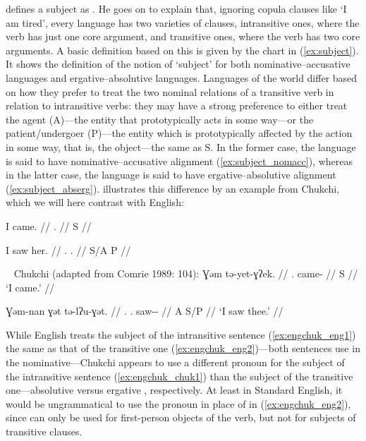 \citet{dixon2010} defines a subject as . He goes on to explain that,
ignoring copula clauses like `I am tired', every language has two varieties of
clauses, intransitive ones, where the verb has just one core argument, and
transitive ones, where the verb has two core arguments. A basic definition
based on this is given by the chart in (\ref{ex:subject}). It shows the
definition of the notion of `subject' for both nominative--accusative languages
and ergative--absolutive languages. Languages of the world differ based on how
they prefer to treat the two nominal relations of a transitive verb in relation
to intransitive verbs: they may have a strong preference to either treat the
agent (A)---the entity that prototypically acts in some way---or the
patient/undergoer (P)---the entity which is prototypically affected by the
action in some way, that is, the object---the same as S. In the former case,
the language is said to have nominative--accusative alignment
(\ref{ex:subject_nomacc}), whereas in the latter case, the language is said to
have ergative--absolutive alignment (\ref{ex:subject_abserg}).
\citet{comrie1989} illustrates this difference by an example from Chukchi,
which we will here contrast with English:

%
\pex\label{ex:engchuk_eng}
\a\label{ex:engchuk_eng1}\begingl
	\gla I came. //
	\glb \Fsg{}.\Nom{} {} //
	\glc S {} //
\endgl

\a\label{ex:engchuk_eng2}\begingl
	\gla I saw her. //
	\glb \Fsg{}.\Nom{} {} \TsgF{}.\Obl{} //
	\glc S/A {} P //
\endgl

\xe

%
\pex~\label{ex:engchuk_chuk}%
Chukchi (adapted from Comrie 1989: 104\nocite{comrie1989}):
\a\label{ex:engchuk_chuk1}\begingl
	\gla Ɣəm tə-yet-ɣʔek. //
	\glb \Fsg{}.\Abs{} came-\Fsg{} //
	\glc S {} //
	\glft `I came.' //
\endgl

\a\label{ex:engchuk_chuk2}\begingl
	\gla Ɣəm-nan ɣət tə-lʔu-ɣət. //
	\glb \Fsg{}.\Erg{} \Ssg{}.\Abs{} saw-\Fsg{}-\Ssg{} //
	\glc A S/P {} //
	\glft `I saw thee.' //
\endgl

\xe

While English treats the subject of the intransitive sentence
(\ref{ex:engchuk_eng1}) the same as that of the transitive one
(\ref{ex:engchuk_eng2})---both sentences use  in the nominative---Chukchi
appears to use a different pronoun for the subject of the intransitive sentence
(\ref{ex:engchuk_chuk1}) than the subject of the transitive one---absolutive
 versus ergative , respectively. At least in Standard
English, it would be ungrammatical to use the pronoun  in place of
 in (\ref{ex:engchuk_eng2}), since  can only be used for
first-person objects of the verb, but not for subjects of transitive clauses.

